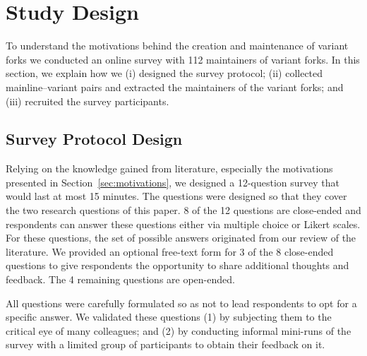 \section{Study Design}
\label{sec:study_design}

To understand the motivations behind the creation and maintenance of variant forks we conducted an online survey with 112 maintainers of variant forks. In this section, we explain how we (i) designed the survey protocol; (ii) collected mainline--variant pairs and extracted the maintainers of the variant forks; and (iii) recruited the survey participants.


\subsection{Survey Protocol Design}
\label{sec:protocal}

Relying on the knowledge gained from literature, especially the motivations presented in Section~\ref{sec:motivations},
 we designed a 12-question survey that would last at most 15 minutes.
The questions were designed so that they cover the two research questions of this paper.
8 of the 12 questions are close-ended and respondents can answer these questions either via multiple choice or Likert scales.
For these questions, the set of possible answers originated from our review of the literature.
We provided an optional free-text form for 3 of the 8 close-ended questions to give respondents the opportunity to share additional thoughts and feedback.
The 4 remaining questions are open-ended.

All questions were carefully formulated so as not to lead respondents to opt for a specific answer. We validated these questions (1) by subjecting them to the critical eye of many colleagues; and (2) by conducting informal mini-runs of the survey with a limited group of participants to obtain their feedback on it.

